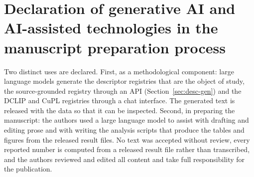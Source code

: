 \documentclass[a4paper,fleqn]{cas-dc}
\begin{document}
\section*{Declaration of generative AI and AI-assisted technologies in the manuscript preparation
process}
Two distinct uses are declared. First, as a methodological component: large language models generate
the descriptor registries that are the object of study, the source-grounded registry through an API
(Section~\ref{sec:desc-gen}) and the DCLIP and CuPL registries through a chat interface. The generated
text is released with the data so that it can be inspected. Second, in preparing the manuscript: the
authors used a large language model to assist with drafting and editing prose and with writing the
analysis scripts that produce the tables and figures from the released result files. No text was
accepted without review, every reported number is computed from a released result file rather than
transcribed, and the authors reviewed and edited all content and take full responsibility for the
publication.



\end{document}
